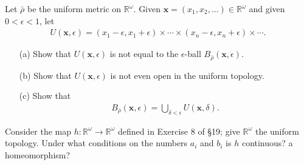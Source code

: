   \begin{exercise}[Munkres 20.6]
    Let $\bar{\rho}$ be the uniform metric on $\mathbb{R}^\omega$. Given $\mathbf{x} = (x_1, x_2, \ldots) \in \mathbb{R}^\omega$ and given $0 < \epsilon < 1$, let
    \begin{align*}
      U(\mathbf{x}, \epsilon) = (x_1 - \epsilon, x_1 + \epsilon) \times \cdots \times (x_n - \epsilon, x_n + \epsilon) \times \cdots.
    \end{align*}
    \begin{enumerate} 
      \item[(a)] Show that $U(\mathbf{x}, \epsilon)$ is not equal to the $\epsilon$-ball $B_{\bar{\rho}}(\mathbf{x}, \epsilon)$.
      \item[(b)] Show that $U(\mathbf{x}, \epsilon)$ is not even open in the uniform topology.
      \item[(c)] Show that
      \begin{align*}
        B_{\bar{\rho}}(\mathbf{x}, \epsilon) = \bigcup_{\delta < \epsilon} U(\mathbf{x}, \delta).
      \end{align*}
    \end{enumerate}
  \end{exercise}

  \begin{exercise}[Munkres 20.7]
    Consider the map $h : \mathbb{R}^\omega \to \mathbb{R}^\omega$ defined in Exercise 8 of \S19; give $\mathbb{R}^\omega$ the uniform topology. Under what conditions on the numbers $a_i$ and $b_i$ is $h$ continuous? a homeomorphism?
  \end{exercise}

